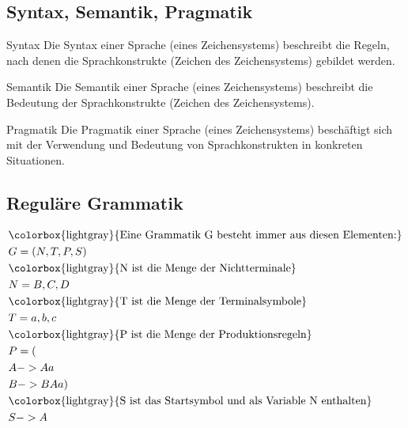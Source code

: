 \subsection{Syntax, Semantik, Pragmatik}
\begin{zitat}{Syntax}
Die Syntax einer Sprache (eines Zeichensystems) beschreibt die Regeln, nach denen die Sprachkonstrukte (Zeichen des Zeichensystems) gebildet werden.
\end{zitat}
\begin{zitat}{Semantik}
Die Semantik einer Sprache (eines Zeichensystems) beschreibt die Bedeutung der Sprachkonstrukte (Zeichen des Zeichensystems). \end{zitat}
\begin{zitat}{Pragmatik}
 Die Pragmatik einer Sprache (eines Zeichensystems) beschäftigt sich mit der Verwendung und Bedeutung von Sprachkonstrukten in konkreten Situationen. \end{zitat}
\subsection{Reguläre Grammatik}
\begin{align*}
&\text{\colorbox{lightgray}{Eine Grammatik G besteht immer aus diesen Elementen:}}\\
&G = (N,T,P,S)\\
&\text{\colorbox{lightgray}{N ist die Menge der Nichtterminale}}\\
&N = {B,C,D}\\
&\text{\colorbox{lightgray}{T ist die Menge der Terminalsymbole}}\\
&T = {a,b,c}\\
&\text{\colorbox{lightgray}{P ist die Menge der Produktionsregeln}}\\
&P =(\\
&A -> Aa\\
&B -> BAa)\\
&\text{\colorbox{lightgray}{S ist das Startsymbol und als Variable N enthalten}}\\
&S -> A
\end{align*}
